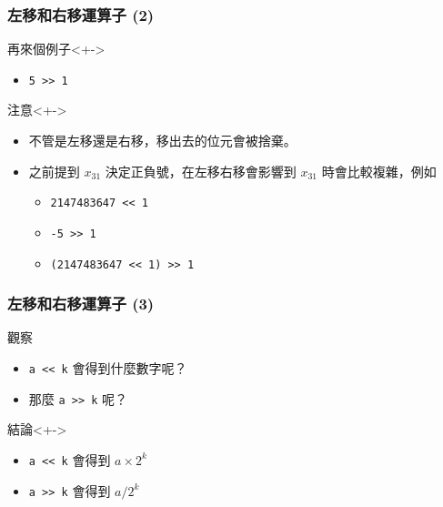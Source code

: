 \documentclass[utf8]{beamer}
\begin{document}
\begin{CJK}{UTF8}{bkai}
\begin{frame}[fragile]
  \frametitle{左移和右移運算子 (2)}
  \begin{exampleblock}{再來個例子}<+->
    \begin{itemize}
    \item \lstinline{5 >> 1}{}
    \end{itemize}
  \end{exampleblock}
  \begin{alertblock}{注意}<+->
    \begin{itemize}
    \item 不管是左移還是右移，移出去的位元會被捨棄。
    \item<+-> 之前提到 $x_{31}$ 決定正負號，在左移右移會影響到 $x_{31}$ 時會比較複雜，例如
      \begin{itemize}[<+->]
      \item \lstinline{2147483647 << 1}{}
      \item \lstinline{-5 >> 1}{}
      \item \lstinline{(2147483647 << 1) >> 1}{}
      \end{itemize}
    \end{itemize}
  \end{alertblock}
\end{frame}

\begin{frame}[fragile]
  \frametitle{左移和右移運算子 (3)}
  \begin{block}{觀察}
    \begin{itemize}[<+->]
    \item \lstinline{a << k}{} 會得到什麼數字呢？
    \item 那麼 \lstinline{a >> k}{} 呢？
    \end{itemize}
  \end{block}
  \begin{alertblock}{結論}<+->
    \begin{itemize}
    \item \lstinline{a << k}{} 會得到 $a\times{2^k}$
    \item<+-> \lstinline{a >> k}{} 會得到 $a / 2^k$
    \end{itemize}
  \end{alertblock}
\end{frame}


\end{CJK}
\end{document}
